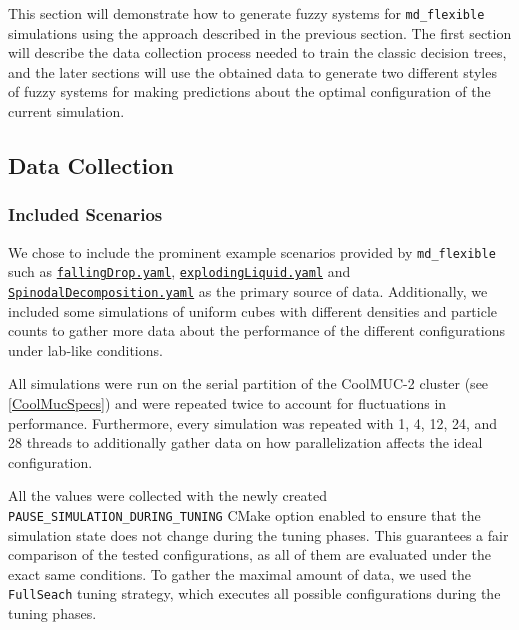 This section will demonstrate how to generate fuzzy systems for \texttt{md\_flexible} simulations using the approach described in the previous section. The first section will describe the data collection process needed to train the classic decision trees, and the later sections will use the obtained data to generate two different styles of fuzzy systems for making predictions about the optimal configuration of the current simulation.

\subsection{Data Collection}

\subsubsection{Included Scenarios}

We chose to include the prominent example scenarios provided by \texttt{md\_flexible} such as \href{https://github.com/AutoPas/AutoPas/blob/c25dc770f173ff160630d7e58f59b38e277032a1/examples/md-flexible/input/fallingDrop.yaml}{\color{blue}\texttt{fallingDrop.yaml}}, \href{https://github.com/AutoPas/AutoPas/blob/c25dc770f173ff160630d7e58f59b38e277032a1/examples/md-flexible/input/explodingLiquid.yaml}{\color{blue} \texttt{explodingLiquid.yaml}} and \href{https://github.com/AutoPas/AutoPas/blob/c25dc770f173ff160630d7e58f59b38e277032a1/examples/md-flexible/input/SpinodalDecomposition.yaml}{\color{blue} \texttt{SpinodalDecomposition.yaml}} as the primary source of data. Additionally, we included some simulations of uniform cubes with different densities and particle counts to gather more data about the performance of the different configurations under lab-like conditions.

All simulations were run on the serial partition of the CoolMUC-2 cluster (see \ref*{CoolMucSpecs})  and were repeated twice to account for fluctuations in performance. Furthermore, every simulation was repeated with 1, 4, 12, 24, and 28 threads to additionally gather data on how parallelization affects the ideal configuration.

All the values were collected with the newly created \texttt{PAUSE\_SIMULATION\_DURING\_TUNING} CMake option enabled to ensure that the simulation state does not change during the tuning phases. This guarantees a fair comparison of the tested configurations, as all of them are evaluated under the exact same conditions. To gather the maximal amount of data, we used the \texttt{FullSeach} tuning strategy, which executes all possible configurations during the tuning phases.


